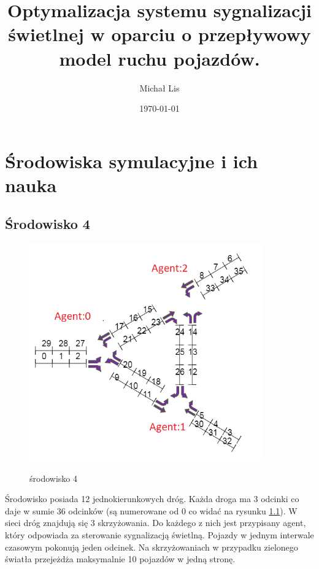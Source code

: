 \documentclass[12pt]{book}
\theoremstyle{plain}
\begin{document}
	\title{Optymalizacja  systemu sygnalizacji świetlnej w 
		oparciu o przepływowy model ruchu pojazdów.}
	\author{Michał Lis}
	\date{\today}
	\maketitle
	\tableofcontents
	
	\chapter {Środowiska symulacyjne i ich nauka}
	\section{Środowisko 4}
	\begin{figure}[H]
		\centering
		\includegraphics[width=10cm]{env_4_agenci}
		\label{fig:env_4_agenci}
		\caption{środowisko 4}
	\end{figure}
	
	Środowisko posiada 12 jednokierunkowych dróg. Każda droga ma 3 odcinki co daje w sumie 36 odcinków (są numerowane od 0 co widać na rysunku \ref{fig:env_4_agenci}).
	W sieci dróg znajdują się 3 skrzyżowania. Do każdego z nich jest przypisany agent, który odpowiada za sterowanie sygnalizacją świetlną.
	Pojazdy w jednym interwale czasowym pokonują jeden odcinek. Na skrzyżowaniach w przypadku zielonego światła przejeżdża maksymalnie 10 pojazdów w jedną stronę.
	
\end{document}
